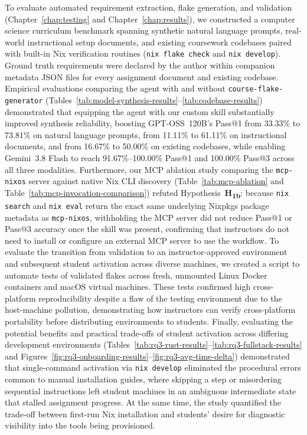 To evaluate automated requirement extraction, flake generation, and validation (Chapter~\ref{chap:testing}
and Chapter~\ref{chap:results}), we constructed a computer science curriculum benchmark
spanning synthetic natural language prompts, real-world instructional setup
documents, and existing coursework codebases paired with built-in Nix verification
routines (\texttt{nix flake check} and \texttt{nix develop}). Ground truth
requirements were declared by the author within companion metadata JSON files
for every assignment document and existing codebase. Empirical evaluations comparing
the agent with and without \texttt{course-flake-generator} (Tables~\ref{tab:model-synthesis-results}--\ref{tab:codebase-results})
demonstrated that equipping the agent with our custom skill substantially improved
synthesis reliability, boosting GPT-OSS~120B's Pass@1 from 33.33\% to 73.81\% on
natural language prompts, from 11.11\% to 61.11\% on instructional documents,
and from 16.67\% to 50.00\% on existing codebases, while enabling Gemini~3.8 Flash
to reach 91.67\%--100.00\% Pass@1 and 100.00\% Pass@3 across all three modalities.
Furthermore, our MCP ablation study comparing the \texttt{mcp-nixos} server
against native Nix CLI discovery (Table~\ref{tab:mcp-ablation} and Table~\ref{tab:mcp-invocation-comparison})
refuted Hypothesis~\textbf{H\textsubscript{1b}}: because \texttt{nix search} and \texttt{nix
eval} return the exact same underlying Nixpkgs package metadata as \texttt{mcp-nixos},
withholding the MCP server did not reduce Pass@1 or Pass@3 accuracy once the
skill was present, confirming that instructors do not need to install or configure
an external MCP server to use the workflow. To evaluate the transition from
validation to an instructor-approved environment and subsequent student
activation across diverse machines, we created a script to automate tests of validated
flakes across fresh, unmounted Linux Docker containers and macOS virtual
machines. These tests confirmed high cross-platform reproducibility despite a flaw
of the testing environment due to the host-machine pollution, demonstrating how
instructors can verify cross-platform portability before distributing
environments to students. Finally, evaluating the potential benefits and
practical trade-offs of student activation across differing development
environments (Tables~\ref{tab:rq3-rust-results}--\ref{tab:rq3-fullstack-results}
and Figures~\ref{fig:rq3-onboarding-results}--\ref{fig:rq3-avg-time-delta})
demonstrated that single-command activation via \texttt{nix develop} eliminated the
procedural errors common to manual installation guides, where skipping a step or
misordering sequential instructions left student machines in an ambiguous
intermediate state that stalled assignment progress. At the same time, the study
quantified the trade-off between first-run Nix installation and students' desire for
diagnostic visibility into the tools being provisioned.

